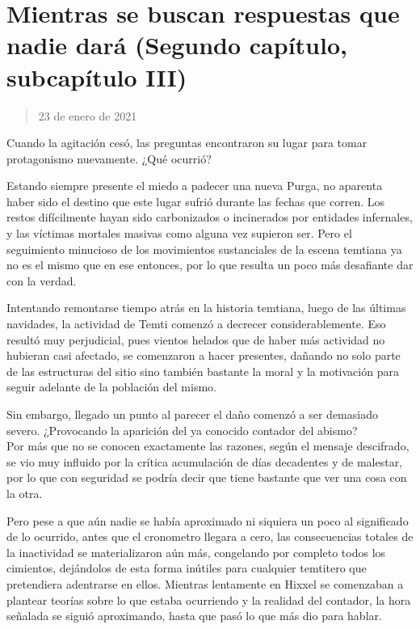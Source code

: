 \documentclass[
  spanish,
]{book}
\begin{document}
\hypertarget{mientras-se-buscan-respuestas-que-nadie-daruxe1-segundo-capuxedtulo-subcapuxedtulo-iii}{%
\section{Mientras se buscan respuestas que nadie dará (Segundo capítulo, subcapítulo III)}\label{mientras-se-buscan-respuestas-que-nadie-daruxe1-segundo-capuxedtulo-subcapuxedtulo-iii}}

\begin{quote}
23 de enero de 2021
\end{quote}

Cuando la agitación cesó, las preguntas encontraron su lugar para tomar protagonismo nuevamente. ¿Qué ocurrió?

Estando siempre presente el miedo a padecer una nueva Purga, no aparenta haber sido el destino que este lugar sufrió durante las fechas que corren. Los restos difícilmente hayan sido carbonizados o incinerados por entidades infernales, y las víctimas mortales masivas como alguna vez supieron ser. Pero el seguimiento minucioso de los movimientos sustanciales de la escena temtiana ya no es el mismo que en ese entonces, por lo que resulta un poco más desafiante dar con la verdad.

Intentando remontarse tiempo atrás en la historia temtiana, luego de las últimas navidades, la actividad de Temti comenzó a decrecer considerablemente. Eso resultó muy perjudicial, pues vientos helados que de haber más actividad no hubieran casi afectado, se comenzaron a hacer presentes, dañando no solo parte de las estructuras del sitio sino también bastante la moral y la motivación para seguir adelante de la población del mismo.

Sin embargo, llegado un punto al parecer el daño comenzó a ser demasiado severo. ¿Provocando la aparición del ya conocido contador del abismo?\\
Por más que no se conocen exactamente las razones, según el mensaje descifrado, se vio muy influido por la crítica acumulación de días decadentes y de malestar, por lo que con seguridad se podría decir que tiene bastante que ver una cosa con la otra.

Pero pese a que aún nadie se había aproximado ni siquiera un poco al significado de lo ocurrido, antes que el cronometro llegara a cero, las consecuencias totales de la inactividad se materializaron aún más, congelando por completo todos los cimientos, dejándolos de esta forma inútiles para cualquier temtitero que pretendiera adentrarse en ellos. Mientras lentamente en Hixxel se comenzaban a plantear teorías sobre lo que estaba ocurriendo y la realidad del contador, la hora señalada se siguió aproximando, hasta que pasó lo que más dio para hablar.
\end{document}
